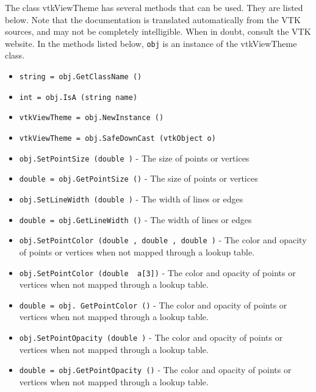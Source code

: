The class vtkViewTheme has several methods that can be used.
  They are listed below.
Note that the documentation is translated automatically from the VTK sources,
and may not be completely intelligible.  When in doubt, consult the VTK website.
In the methods listed below, \verb|obj| is an instance of the vtkViewTheme class.
\begin{itemize}
\item  \verb|string = obj.GetClassName ()|

\item  \verb|int = obj.IsA (string name)|

\item  \verb|vtkViewTheme = obj.NewInstance ()|

\item  \verb|vtkViewTheme = obj.SafeDownCast (vtkObject o)|

\item  \verb|obj.SetPointSize (double )| -  The size of points or vertices

\item  \verb|double = obj.GetPointSize ()| -  The size of points or vertices

\item  \verb|obj.SetLineWidth (double )| -  The width of lines or edges

\item  \verb|double = obj.GetLineWidth ()| -  The width of lines or edges

\item  \verb|obj.SetPointColor (double , double , double )| -  The color and opacity of points or vertices when not mapped through
 a lookup table.

\item  \verb|obj.SetPointColor (double  a[3])| -  The color and opacity of points or vertices when not mapped through
 a lookup table.

\item  \verb|double = obj. GetPointColor ()| -  The color and opacity of points or vertices when not mapped through
 a lookup table.

\item  \verb|obj.SetPointOpacity (double )| -  The color and opacity of points or vertices when not mapped through
 a lookup table.

\item  \verb|double = obj.GetPointOpacity ()| -  The color and opacity of points or vertices when not mapped through
 a lookup table.


\end{itemize}
